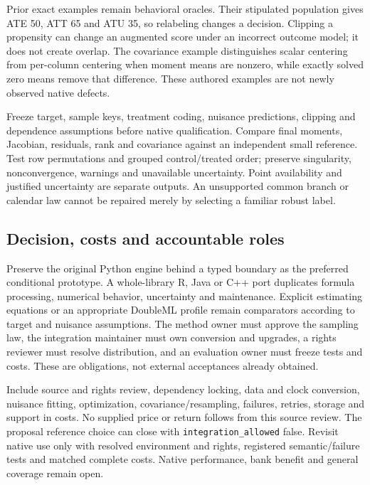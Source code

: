 Prior exact examples remain behavioral oracles. Their stipulated population gives ATE 50, ATT 65 and ATU 35, so relabeling changes a decision. Clipping a propensity can change an augmented score under an incorrect outcome model; it does not create overlap. The covariance example distinguishes scalar centering from per-column centering when moment means are nonzero, while exactly solved zero means remove that difference. These authored examples are not newly observed native defects.\citep{exec20_python_effect_reference}

Freeze target, sample keys, treatment coding, nuisance predictions, clipping and dependence assumptions before native qualification. Compare final moments, Jacobian, residuals, rank and covariance against an independent small reference. Test row permutations and grouped control/treated order; preserve singularity, nonconvergence, warnings and unavailable uncertainty. Point availability and justified uncertainty are separate outputs. An unsupported common branch or calendar law cannot be repaired merely by selecting a familiar robust label.\citep{exec20_python_effect_source,exec20_python_effect_reference}

\subsection{Decision, costs and accountable roles}
Preserve the original Python engine behind a typed boundary as the preferred conditional prototype. A whole-library R, Java or C++ port duplicates formula processing, numerical behavior, uncertainty and maintenance. Explicit estimating equations or an appropriate DoubleML profile remain comparators according to target and nuisance assumptions. The method owner must approve the sampling law, the integration maintainer must own conversion and upgrades, a rights reviewer must resolve distribution, and an evaluation owner must freeze tests and costs. These are obligations, not external acceptances already obtained.\citep{exec20_python_effect_source,exec24_statsmodels_distribution}

Include source and rights review, dependency locking, data and clock conversion, nuisance fitting, optimization, covariance/resampling, failures, retries, storage and support in costs. No supplied price or return follows from this source review. The proposal reference choice can close with \texttt{integration\_allowed} false. Revisit native use only with resolved environment and rights, registered semantic/failure tests and matched complete costs. Native performance, bank benefit and general coverage remain open.\citep{exec20_python_effect_source,exec24_statsmodels_distribution}
